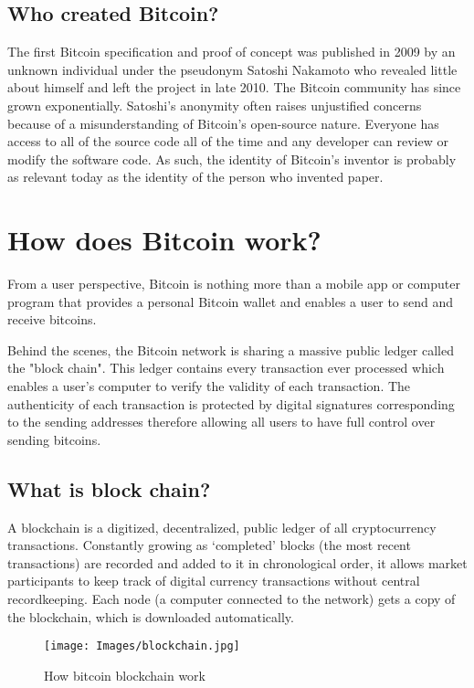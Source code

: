 \documentclass{article}
\begin{document}
\subsection{Who created Bitcoin?}
The first Bitcoin specification and proof of concept was published in 2009 by an unknown individual under the pseudonym Satoshi Nakamoto who revealed little about himself and left the project in late 2010. The Bitcoin community has since grown exponentially.
\newline
Satoshi's anonymity often raises unjustified concerns because of a misunderstanding of Bitcoin's open-source nature. Everyone has access to all of the source code all of the time and any developer can review or modify the software code. As such, the identity of Bitcoin's inventor is probably as relevant today as the identity of the person who invented paper.






\section{How does Bitcoin work?}
From a user perspective, Bitcoin is nothing more than a mobile app or computer program that provides a personal Bitcoin wallet and enables a user to send and receive bitcoins.

Behind the scenes, the Bitcoin network is sharing a massive public ledger called the "block chain". This ledger contains every transaction ever processed which enables a user's computer to verify the validity of each transaction. The authenticity of each transaction is protected by digital signatures corresponding to the sending addresses therefore allowing all users to have full control over sending bitcoins.
\subsection{What is block chain?}
A blockchain is a digitized, decentralized, public ledger of all cryptocurrency transactions. Constantly growing as ‘completed’ blocks (the most recent transactions) are recorded and added to it in chronological order, it allows market participants to keep track of digital currency transactions without central recordkeeping. Each node (a computer connected to the network) gets a copy of the blockchain, which is downloaded automatically.

\newpage

    \begin{figure}[h]
         \centering
        \texttt{[image: Images/blockchain.jpg]}
        \caption{How bitcoin blockchain work}
    \end{figure}
    
\end{document}
